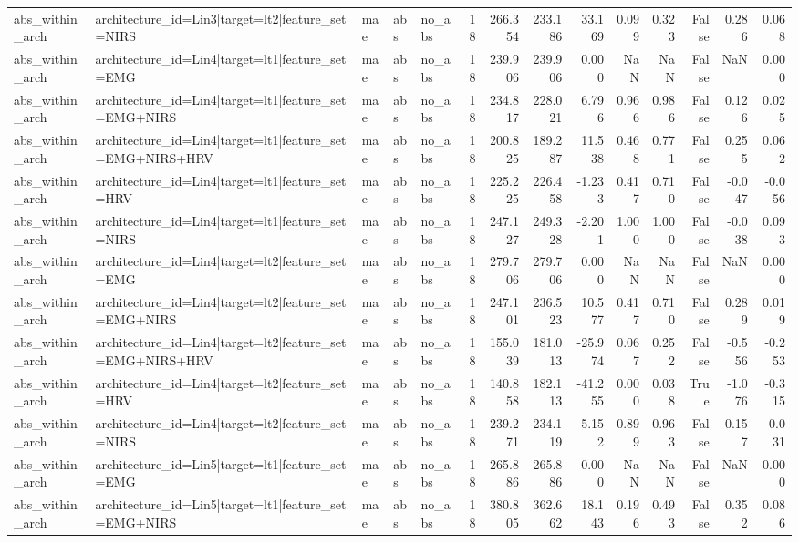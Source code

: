 \begin{table}
\begin{tabular}{lllllrrrrrrrrr}
abs_within_arch & architecture_id=Lin3|target=lt2|feature_set=NIRS & mae & abs & no_abs & 18 & 266.354 & 233.186 & 33.169 & 0.099 & 0.323 & False & 0.286 & 0.068 \\
abs_within_arch & architecture_id=Lin4|target=lt1|feature_set=EMG & mae & abs & no_abs & 18 & 239.906 & 239.906 & 0.000 & NaN & NaN & False & NaN & 0.000 \\
abs_within_arch & architecture_id=Lin4|target=lt1|feature_set=EMG+NIRS & mae & abs & no_abs & 18 & 234.817 & 228.021 & 6.796 & 0.966 & 0.986 & False & 0.126 & 0.025 \\
abs_within_arch & architecture_id=Lin4|target=lt1|feature_set=EMG+NIRS+HRV & mae & abs & no_abs & 18 & 200.825 & 189.287 & 11.538 & 0.468 & 0.771 & False & 0.255 & 0.062 \\
abs_within_arch & architecture_id=Lin4|target=lt1|feature_set=HRV & mae & abs & no_abs & 18 & 225.225 & 226.458 & -1.233 & 0.417 & 0.710 & False & -0.047 & -0.056 \\
abs_within_arch & architecture_id=Lin4|target=lt1|feature_set=NIRS & mae & abs & no_abs & 18 & 247.127 & 249.328 & -2.201 & 1.000 & 1.000 & False & -0.038 & 0.093 \\
abs_within_arch & architecture_id=Lin4|target=lt2|feature_set=EMG & mae & abs & no_abs & 18 & 279.706 & 279.706 & 0.000 & NaN & NaN & False & NaN & 0.000 \\
abs_within_arch & architecture_id=Lin4|target=lt2|feature_set=EMG+NIRS & mae & abs & no_abs & 18 & 247.101 & 236.523 & 10.577 & 0.417 & 0.710 & False & 0.289 & 0.019 \\
abs_within_arch & architecture_id=Lin4|target=lt2|feature_set=EMG+NIRS+HRV & mae & abs & no_abs & 18 & 155.039 & 181.013 & -25.974 & 0.067 & 0.252 & False & -0.556 & -0.253 \\
abs_within_arch & architecture_id=Lin4|target=lt2|feature_set=HRV & mae & abs & no_abs & 18 & 140.858 & 182.113 & -41.255 & 0.000 & 0.038 & True & -1.076 & -0.315 \\
abs_within_arch & architecture_id=Lin4|target=lt2|feature_set=NIRS & mae & abs & no_abs & 18 & 239.271 & 234.119 & 5.152 & 0.899 & 0.963 & False & 0.157 & -0.031 \\
abs_within_arch & architecture_id=Lin5|target=lt1|feature_set=EMG & mae & abs & no_abs & 18 & 265.886 & 265.886 & 0.000 & NaN & NaN & False & NaN & 0.000 \\
abs_within_arch & architecture_id=Lin5|target=lt1|feature_set=EMG+NIRS & mae & abs & no_abs & 18 & 380.805 & 362.662 & 18.143 & 0.196 & 0.493 & False & 0.352 & 0.086 \\

\end{tabular}
\end{table}

